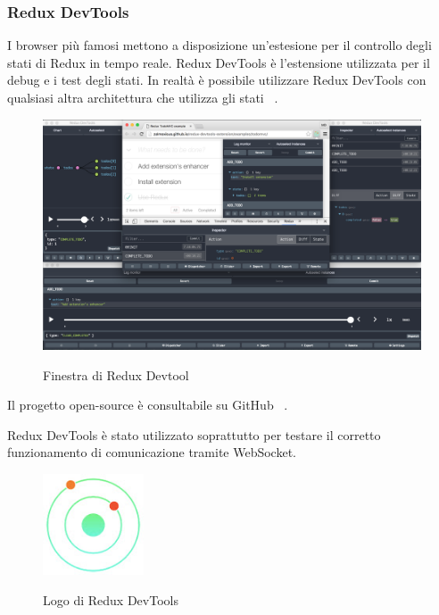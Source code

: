 \subsubsection{Redux DevTools}
I browser più famosi mettono a disposizione un'estesione per il controllo degli stati di Redux in tempo reale.
Redux DevTools è l'estensione utilizzata per il debug e i test degli stati.\newline
In realtà è possibile utilizzare Redux DevTools con qualsiasi altra architettura che utilizza gli stati ~\cite{ReduxDev96:online}.
\begin{figure}[H]
    \caption{Finestra di Redux Devtool ~\cite{zalmoxis63:online}}
    \centering
    \includegraphics[width=150mm]{img/general/redux_screen.png}
    \label{fig:reduxDevWindow}
\end{figure}
Il progetto open-source è consultabile su GitHub ~\cite{zalmoxis63:online}.

\noindent Redux DevTools è stato utilizzato soprattutto per testare il corretto funzionamento di comunicazione tramite WebSocket.
\begin{figure}[H]
    \caption{Logo di Redux DevTools ~\cite{ReduxDev39:online}}
    \centering
    \includegraphics[width=30mm]{img/logos/redux_devtool.jpg}
    \label{fig:reduxDev}
\end{figure}
\newpage
